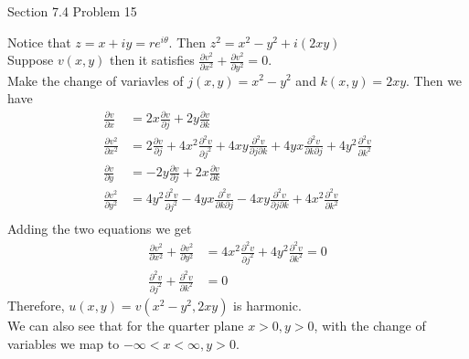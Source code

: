 \documentclass[answers,12pt,addpoints]{exam}
\begin{document}
\begin{questions}
    \question Section 7.4 Problem 15
    \begin{solution}
        Notice that $z = x + iy =  r e^{i\theta}$. Then $z^2 = x^2 - y^2 + i(2xy)$\\
        Suppose $v(x,y)$ then it satisfies $\frac{\partial v^2}{\partial x^2} + \frac{\partial v^2}{\partial y^2} = 0$.\\
        Make the change of variavles of $j(x,y) = x^2 - y^2$ and $k(x,y) = 2xy$. Then we have
        \begin{align*}
            \frac{\partial v}{\partial x} &= 2x \frac{\partial v}{\partial j} + 2y \frac{\partial v}{\partial k}\\
            \frac{\partial v^2}{\partial x^2} &= 2 \frac{\partial v}{\partial j} + 4x^2 \frac{\partial^2 v}{\partial j^2} + 4xy \frac{\partial^2 v}{\partial j \partial k} + 4yx \frac{\partial^2 v}{\partial k \partial j} + 4y^2 \frac{\partial^2 v}{\partial k^2}\\  
            \frac{\partial v}{\partial y} &= -2y \frac{\partial v}{\partial j} + 2x \frac{\partial v}{\partial k}\\
            \frac{\partial v^2}{\partial y^2} &= 4y^2 \frac{\partial^2 v}{\partial j^2} - 4yx \frac{\partial^2 v}{\partial k \partial j} - 4xy \frac{\partial^2 v}{\partial j \partial k} + 4x^2 \frac{\partial^2 v}{\partial k^2}\\
        \end{align*}
        Adding the two equations we get
        \begin{align*}
            \frac{\partial v^2}{\partial x^2} + \frac{\partial v^2}{\partial y^2} &= 4x^2 \frac{\partial^2 v}{\partial j^2} + 4y^2 \frac{\partial^2 v}{\partial k^2} = 0\\
            \frac{\partial^2 v}{\partial j^2} + \frac{\partial^2 v}{\partial k^2} &= 0
        \end{align*}
        Therefore, $u(x,y) = v(x^2 - y^2, 2xy)$ is harmonic.\\

        We can also see that for the quarter plane $x > 0, y > 0$, with the change of variables we map to $-\infty < x < \infty, y > 0$.
        


    \end{solution}
\end{questions}
\end{document}
